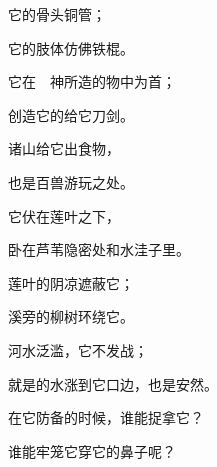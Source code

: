 {\par }{\Q {}它的骨头{}铜管；
\par }{\Q 它的肢体仿佛铁棍。
\par }{\BB \par }{\Q {}它在　神所造的物中为首；
\par }{\Q 创造它的给它刀剑。
\par }{\Q {}诸山给它出食物，
\par }{\Q 也是百兽游玩之处。
\par }{\Q {}它伏在莲叶之下，
\par }{\Q 卧在芦苇隐密处和水洼子里。
\par }{\Q {}莲叶的阴凉遮蔽它；
\par }{\Q 溪旁的柳树环绕它。
\par }{\Q {}河水泛滥，它不发战；
\par }{\Q 就是{}的水涨到它口边，也是安然。
\par }{\Q {}在它防备的时候，谁能捉拿它？
\par }{\Q 谁能牢笼它穿它的鼻子呢？

}
